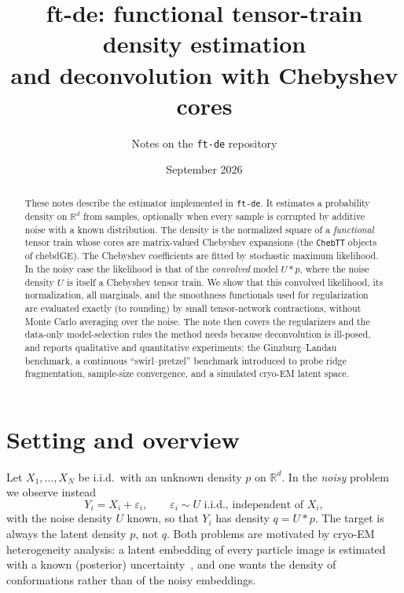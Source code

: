 \documentclass[11pt]{article}
\title{\textbf{ft-de}: functional tensor-train density estimation\\ and deconvolution with Chebyshev cores}
\author{Notes on the \texttt{ft-de} repository}
\date{September 2026}
\theoremstyle{definition}
\theoremstyle{remark}
\newcommand{\R}{\mathbb{R}}
\begin{document}
\maketitle

\begin{abstract}
These notes describe the estimator implemented in \texttt{ft-de}. It estimates a
probability density on $\R^d$ from samples, optionally when every sample is corrupted by
additive noise with a known distribution. The density is the normalized square of a
\emph{functional} tensor train whose cores are matrix-valued Chebyshev expansions (the
\texttt{ChebTT} objects of chebdGE). The Chebyshev coefficients are fitted by
stochastic maximum likelihood. In the noisy case the likelihood is that of the
\emph{convolved} model $U*p$, where the noise density $U$ is itself a Chebyshev tensor
train. We show that this convolved likelihood, its normalization, all marginals, and the
smoothness functionals used for regularization are evaluated exactly (to rounding) by
small tensor-network contractions, without Monte Carlo averaging over the noise. The note
then covers the regularizers and the data-only model-selection rules the method needs
because deconvolution is ill-posed, and reports qualitative and quantitative experiments:
the Ginzburg--Landau benchmark, a continuous ``swirl--pretzel'' benchmark introduced to
probe ridge fragmentation, sample-size convergence, and a simulated cryo-EM latent space.
\end{abstract}

\tableofcontents

\section{Setting and overview}
\label{sec:intro}

Let $X_1,\dots,X_N$ be i.i.d.\ with an unknown density $p$ on $\R^d$. In the \emph{noisy}
problem we observe instead
\begin{equation}\label{eq:noisy-model}
  Y_i = X_i + \varepsilon_i,\qquad \varepsilon_i \sim U \text{ i.i.d., independent of } X_i,
\end{equation}
with the noise density $U$ known, so that $Y_i$ has density $q=U*p$. The target is always the latent density $p$, not $q$. Both problems are
motivated by cryo-EM heterogeneity analysis: a latent embedding of every particle image is estimated with a known
(posterior) uncertainty~\cite{gilles2025recovar}, and one wants the density of conformations rather than of the
noisy embeddings.
\end{document}
